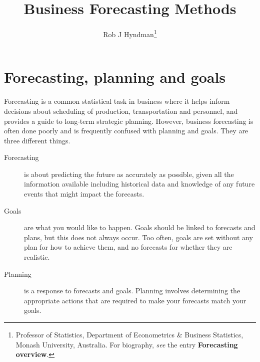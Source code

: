 \documentclass[a4paper,10pt]{article}
\begin{document}
\title{Business Forecasting Methods}
\author{Rob J Hyndman\footnote{Professor of Statistics, Department of Econometrics \& Business Statistics, Monash University, Australia. For biography, \textit{see} the entry \textbf{Forecasting overview}.}}
\date{}
\maketitle

\section{Forecasting, planning and goals}

Forecasting is a common statistical task in business where it helps inform decisions about scheduling of production, transportation and personnel, and provides a guide to long-term strategic planning. However, business forecasting is often done poorly and is frequently confused with planning and goals. They are three different things.
\begin{description}
	\item[Forecasting] is about predicting the future as accurately as possible, given all the information available including historical data and knowledge of any future events that might impact the forecasts.
	\item[Goals] are what you would like to happen. Goals should be linked to forecasts and plans, but this does not always occur. Too often, goals are set without any plan for how to achieve them, and no forecasts for whether they are realistic.
	\item[Planning] is a response to forecasts and goals. Planning involves determining the appropriate actions that are required to make your forecasts match your goals.
\end{description}
\end{document}
